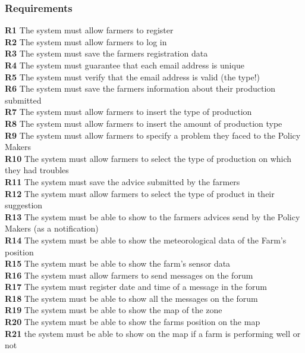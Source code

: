 \subsubsection{Requirements}
\textbf{R1} The system must allow farmers to register\\
\textbf{R2} The system must allow farmers to log in\\
\textbf{R3} The system must save the farmers registration data\\
\textbf{R4} The system must guarantee that each email address is unique\\
\textbf{R5} The system must verify that the email address is valid (the type!)\\
\textbf{R6} The system must save the farmers information about their production submitted\\
\textbf{R7} The system must allow farmers to insert the type of production \\
\textbf{R8} The system must allow farmers to insert the amount of production type\\
\textbf{R9} The system must allow farmers to specify a problem they faced to the Policy Makers\\
\textbf{R10} The system must allow farmers to select the type of production on which they had troubles\\
\textbf{R11} The system must save the advice submitted by the farmers\\
\textbf{R12} The system must allow farmers to select the type of product in their suggestion\\
\textbf{R13} The system must be able to show to the farmers advices send by the Policy Makers (as a notification)\\
\textbf{R14} The system must be able to show the meteorological data of the Farm’s position\\
\textbf{R15} The system must be able to show the farm’s sensor data \\
\textbf{R16} The system must allow farmers to send messages on the forum\\
\textbf{R17} The system must register date and time of a message in the forum\\
\textbf{R18} The system must be able to show all the messages on the forum\\
\textbf{R19} The system must be able to show the map of the zone\\
\textbf{R20} The system must be able to show the farms position on the map\\
\textbf{R21} the system must be able to show on the map if a farm is performing well or not \\
